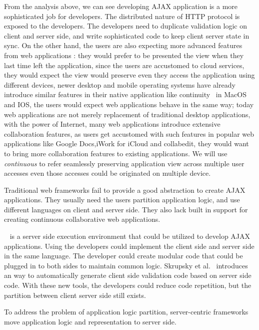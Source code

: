 From the analysis above,
we can see developing AJAX application is a more sophisticated job for developers.
The distributed nature of HTTP protocol is exposed to the developers.
The developers need to duplicate validation logic on client and server side,
and write sophisticated \js{} code to keep client server state in sync.
On the other hand, 
the users are also expecting more advanced features from web applications :
they would prefer to be presented the view when they last time left the application,
since the users are accustomed to cloud services,
they would expect the view would preserve even they access the application
using different devices,
newer desktop and mobile operating systems have already introduce similar
features in their native application like continuity~\cite{apple} in MacOS and IOS,
the users would expect web applications behave in the same way;
today web applications are not merely replacement of traditional desktop applications,
with the power of Internet,
many web applications introduce extensive collaboration features,
as users get accustomed with such features in popular web applications
like Google Docs,iWork for iCloud and collabedit,
they would want to bring more collaboration features to existing applications.
We will use \emph{continuous} to refer seamlessly preserving application view across
multiple user accesses even those accesses could be originated on multiple device.

Traditional web frameworks fail to provide a good abstraction to create
AJAX applications.
They usually need the users partition application logic,
and use different languages on client and server side.
They also lack built in support for creating
continuous collaborative web applications.

\nodejs{}~\cite{tilkov2010node} is a server side \js{} execution environment
that could be utilized to develop AJAX applications.
Using \nodejs{} the developers could implement the client side and server side
in the same language.
The developer could create modular code that could be plugged in to both sides
 to maintain common logic.
Skrupsky et al.~\cite{skrupsky2012don} introduces an way to automatically generate
client side validation code based on server side code.
With these new tools, the developers could reduce code repetition,
but the partition between client server side still exists.



To address the problem of application logic partition, 
server-centric frameworks move application logic and representation to server side.

